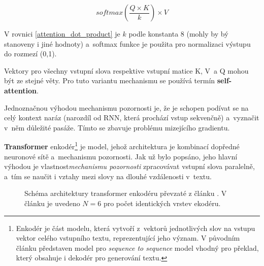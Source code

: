 \begin{equation}
    \label{attention_dot_product}
    softmax(\frac{Q \times K}{k})\times V
\end{equation}

V rovnici \ref{attention_dot_product} je $k$ podle \cite{Transformers} konstanta 8 (mohly by bý stanoveny i jiné hodnoty) a~softmax funkce je použita pro normalizaci výstupu do rozmezí (0,1).\par
Vektory pro všechny vstupní slova respektive vstupní matice K, V~a Q mohou být ze stejné věty. Pro tuto variantu mechanismu se používá termín \textbf{self-attention}.\par 
Jednoznačnou výhodou mechanismu pozornosti je, že je schopen podívat se na celý kontext naráz (narozdíl od RNN, která prochází vstup sekvenčně) a~vyznačit v~něm důležité pasáže. Tímto se zbavuje problému mizejícího gradientu.\par\medskip

\textbf{Transformer} enkodér\footnote{Enkodér je část modelu, která vytvoří z~vektorů jednotlivých slov na vstupu vektor celého vstupního textu, reprezentující jeho význam. V původním článku \cite{Transformers} představen model pro \emph{sequence to sequence} model vhodný pro překlad, který obsahuje i dekodér pro generování textu.} je model, jehož architektura je kombinací dopředné neuronové sítě a~mechanismu pozornosti. Jak už bylo popsáno, jeho hlavní výhodou je vlastnost\linebreak \emph{mechanismu pozornosti} zpracovávat vstupní slova paralelně, a~tím se naučit i vztahy mezi slovy na dlouhé vzdálenosti v~textu.\par

\begin{figure}[hbt]
    \centering
	\caption{Schéma architektury transformer enkodéru převzaté z článku \cite{Transformers}. V článku je uvedeno $N=6$ pro počet identických vrstev ekodéru. }
	\label{transformer_encoder}
\end{figure}

